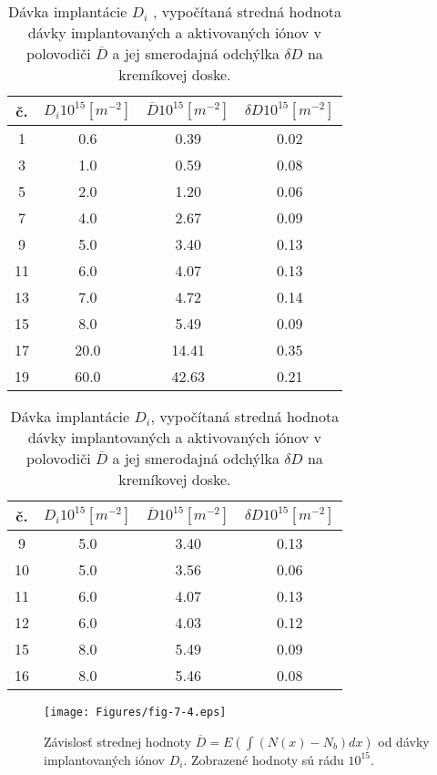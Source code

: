 \begin{table}[h!]\centering
\begin{tabular}{|c|c|c|c|}
\hline
č. & $D_{i} 10^{15} [m^{-2}]$ & $\overline D 10^{15} [m^{-2}]$ & $\delta D 10^{15} [m^{-2}]$ \\
\hline
 1 &  0.6 &  0.39 &  0.02 \\
 3 &  1.0 &  0.59 &  0.08 \\
 5 &  2.0 &  1.20 &  0.06 \\
 7 &  4.0 &  2.67 &  0.09 \\
 9 &  5.0 &  3.40 &  0.13 \\
11 &  6.0 &  4.07 &  0.13 \\
13 &  7.0 &  4.72 &  0.14 \\
15 &  8.0 &  5.49 &  0.09 \\
17 & 20.0 & 14.41 &  0.35 \\
19 & 60.0 & 42.63 &  0.21 \\
\hline
\end{tabular}
\captionsetup{justification=raggedright, singlelinecheck=false}
{\caption [Dávky implantácie $D_{i}$] {Dávka implantácie $D_{i}$ ,
    vypočítaná stredná hodnota dávky implantovaných a aktivovaných
    iónov v polovodiči $\overline D$ a jej smerodajná odchýlka $\delta
    D$ na kremíkovej doske.}\label{tab:7.2}}
\end{table}

\begin{table}[h!]\centering
\begin{tabular}{|c|c|c|c|}
\hline
č. & $D_{i} 10^{15} [m^{-2}]$ & $\overline D 10^{15} [m^{-2}]$ & $\delta D 10^{15} [m^{-2}]$ \\
\hline
 9 & 5.0 & 3.40 & 0.13 \\
10 & 5.0 & 3.56 & 0.06 \\
11 & 6.0 & 4.07 & 0.13 \\
12 & 6.0 & 4.03 & 0.12 \\
15 & 8.0 & 5.49 & 0.09 \\
16 & 8.0 & 5.46 & 0.08 \\
\hline
\end{tabular}
\captionsetup{justification=raggedright, singlelinecheck=false}
{\caption[Dávka implantácie $D_{i}$]{Dávka implantácie $D_{i}$,
    vypočítaná stredná hodnota dávky implantovaných a aktivovaných
    iónov v polovodiči $\overline D$ a jej smerodajná odchýlka $\delta
    D$ na kremíkovej doske.}\label{tab:7.3}}
\end{table}

\begin{figure}[h!]\centering
\texttt{[image: Figures/fig-7-4.eps]}
\captionsetup{justification=raggedright, singlelinecheck=false}
{\caption[Závislosť strednej hodnoty
    $\overline{D}=E(\int(N(x)-N_{b})dx)$ od dávky implantovaných iónov
    $D_{i}$]{Závislosť strednej hodnoty
    $\overline{D}=E(\int(N(x)-N_{b})dx)$ od dávky implantovaných iónov
    $D_{i}$. Zobrazené hodnoty sú rádu $10^{15}$.}\label{fig:7.4}}
\end{figure}

